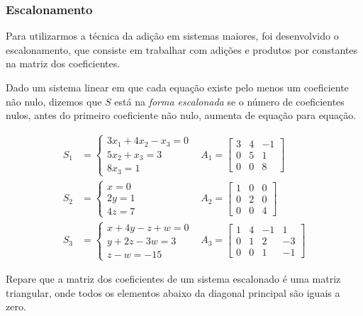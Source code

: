\subsubsection{Escalonamento}
Para utilizarmos a técnica da adição em sistemas maiores, foi desenvolvido o escalonamento, que consiste em trabalhar com adições e produtos por constantes na matriz dos coeficientes. \par 
\begin{df}
Dado um sistema linear em que cada equação existe pelo menos um coeficiente não nulo, dizemos que $S$ está na \emph{forma escalonada} se o número de coeficientes nulos, antes do primeiro coeficiente não nulo, aumenta de equação para equação.
\end{df}
\begin{exemplo}
\begin{align*}
S_1&=\begin{cases}
3x_1+4x_2-x_3=0 \\
	 5x_2+x_3=3 \\
		 8x_3=1
\end{cases}  &A_1=\begin{bmatrix}
3 & 4 & -1 \\
0 & 5 & 1 \\
0 & 0 & 8
\end{bmatrix} \\
S_2&=\begin{cases}
x=0\\
2y=1\\
4z=7
\end{cases}  &A_2=\begin{bmatrix}
1 & 0 & 0 \\
0 & 2 & 0 \\
0 & 0 & 4
\end{bmatrix} \\
S_3&=\begin{cases}
x+4y-z+w=0 \\
y+2z-3w=3\\
z-w=-15
\end{cases} &A_3=\begin{bmatrix}
1 & 4 & -1 & 1 \\
0 & 1 & 2 & -3 \\
0 & 0 & 1 & -1
\end{bmatrix}
\end{align*}\end{exemplo}
Repare que a matriz dos coeficientes de um sistema escalonado é uma matriz triangular, onde todos os elementos abaixo da diagonal principal são iguais a zero. \par
